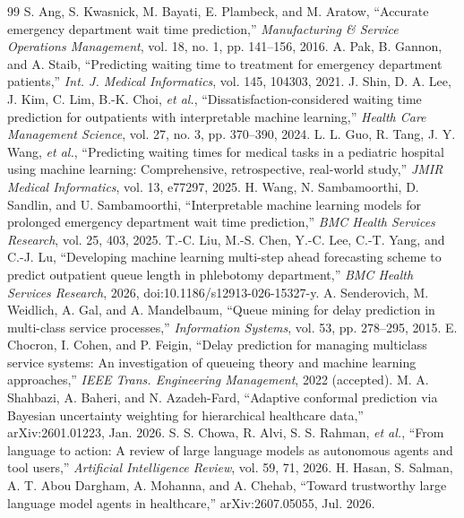 \documentclass[11pt,twocolumn]{article}
\begin{document}
\linespread{1.0}\selectfont\begin{thebibliography}{99}\footnotesize\setlength{\itemsep}{2pt}
 S. Ang, S. Kwasnick, M. Bayati, E. Plambeck, and M. Aratow, ``Accurate emergency department wait time prediction,'' \textit{Manufacturing \& Service Operations Management}, vol. 18, no. 1, pp. 141--156, 2016.
 A. Pak, B. Gannon, and A. Staib, ``Predicting waiting time to treatment for emergency department patients,'' \textit{Int. J. Medical Informatics}, vol. 145, 104303, 2021.
 J. Shin, D. A. Lee, J. Kim, C. Lim, B.-K. Choi, \textit{et al.}, ``Dissatisfaction-considered waiting time prediction for outpatients with interpretable machine learning,'' \textit{Health Care Management Science}, vol. 27, no. 3, pp. 370--390, 2024.
 L. L. Guo, R. Tang, J. Y. Wang, \textit{et al.}, ``Predicting waiting times for medical tasks in a pediatric hospital using machine learning: Comprehensive, retrospective, real-world study,'' \textit{JMIR Medical Informatics}, vol. 13, e77297, 2025.
 H. Wang, N. Sambamoorthi, D. Sandlin, and U. Sambamoorthi, ``Interpretable machine learning models for prolonged emergency department wait time prediction,'' \textit{BMC Health Services Research}, vol. 25, 403, 2025.
 T.-C. Liu, M.-S. Chen, Y.-C. Lee, C.-T. Yang, and C.-J. Lu, ``Developing machine learning multi-step ahead forecasting scheme to predict outpatient queue length in phlebotomy department,'' \textit{BMC Health Services Research}, 2026, doi:10.1186/s12913-026-15327-y.
 A. Senderovich, M. Weidlich, A. Gal, and A. Mandelbaum, ``Queue mining for delay prediction in multi-class service processes,'' \textit{Information Systems}, vol. 53, pp. 278--295, 2015.
 E. Chocron, I. Cohen, and P. Feigin, ``Delay prediction for managing multiclass service systems: An investigation of queueing theory and machine learning approaches,'' \textit{IEEE Trans. Engineering Management}, 2022 (accepted).
 M. A. Shahbazi, A. Baheri, and N. Azadeh-Fard, ``Adaptive conformal prediction via Bayesian uncertainty weighting for hierarchical healthcare data,'' arXiv:2601.01223, Jan. 2026.
 S. S. Chowa, R. Alvi, S. S. Rahman, \textit{et al.}, ``From language to action: A review of large language models as autonomous agents and tool users,'' \textit{Artificial Intelligence Review}, vol. 59, 71, 2026.
 H. Hasan, S. Salman, A. T. Abou Dargham, A. Mohanna, and A. Chehab, ``Toward trustworthy large language model agents in healthcare,'' arXiv:2607.05055, Jul. 2026.

\end{thebibliography}
\end{document}
